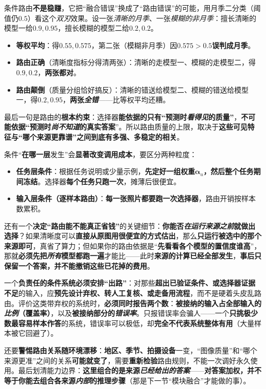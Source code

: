 条件路由\textbf{不是稳赚}，它把“融合错误”换成了“路由错误”的可能，用月季二分类（阈值仍$0.5$）看这个\emph{双刃}效果。设一张\emph{清晰的月季}、一张\emph{模糊的非月季}：擅长清晰的模型一给$0.9,0.95$，擅长模糊的模型二给$0.2,0.2$。
\begin{itemize}\item \textbf{等权平均}：得$0.55,0.575$，第二张（模糊非月季）因$0.575>0.5$\textbf{误判成月季}。\item \textbf{路由正确}（清晰度指标分得清两张）：清晰的走模型一、模糊的走模型二，得$0.9,0.2$，\textbf{两张都对}。\item \textbf{路由颠倒}（质量分组恰好搞反）：清晰的错送给模型二、模糊的错送给模型一，得$0.2,0.95$，\textbf{两张\emph{全错}}——比等权平均还糟。\end{itemize}
最后一句是路由的\textbf{根本约束}：选择器\textbf{能依据的只有“预测时\emph{看得见}的质量”}，\textbf{不可能依据“预测时\emph{尚不知道}的真实答案}”。所以路由质量的上限，取决于\textbf{这些可见特征与“哪个来源更靠谱”之间到底有多强、多稳定的相关}。

条件“\textbf{在哪一层}发生”会\textbf{显著改变调用成本}，要区分两种粒度：
\begin{itemize}\item \textbf{任务层条件}：根据任务说明或少量示例，\textbf{先定好一组权重$\bm{\alpha}_u$，然后整个任务期间冻结}。选择器\textbf{每个任务只跑一次}，摊薄后很便宜。\item \textbf{输入层条件（逐样本路由）}：\textbf{每一张照片都要跑一次选择器}，路由开销按样本数累积。\end{itemize}
还有一个\textbf{决定“路由能不能真正省钱”}的关键细节：\textbf{你能否\emph{在运行来源\emph{之前}}就做出选择}？如果清晰度可以\textbf{直接从原图用很便宜的方式估出}，那么\textbf{只运行被选中的那个来源即可}，真省了算力；但如果你的路由依据是“\textbf{先看看各个模型的置信度谁高}”，那就\textbf{必须先把\emph{所有}模型都跑一遍}才能比——此时\textbf{来源的计算已经全部发生}，\textbf{事后只保留一个答案，并不能撤销这些已花掉的费用}。

一个\textbf{负责任的条件系统必须安排“出路”}：对那些\textbf{超出已验证条件、或选择器证据不足}的输入，应\textbf{预先设计弃权、转人工复核、或走备用流程}，而不是硬着头皮乱路由。评价这类带弃权的系统时，\textbf{必须同时报告两个数}：\textbf{被接纳的输入占全部输入的\emph{比例}（覆盖率）}，以及\textbf{被接纳部分的\emph{错误率}}。只报错误率会骗人——一个\textbf{只挑极少数最容易样本作答}的系统，错误率可以极低，却\textbf{完全不代表系统整体有用}（大量样本被它回避了）。

还要\textbf{警惕路由关系随环境漂移}：\textbf{地区、季节、拍摄设备}一变，“图像质量”和“哪个来源更准”之间的关系\textbf{可能就变了}，需要\textbf{重新检验}路由规则，不能一次调好永久使用。最后划清能力边界：\textbf{这里组合的是来源\emph{已经给出的答案}}——\textbf{对答案加权，并不等于你能去组合各来源\emph{内部}的推理步骤}（那是下一节“模块融合”才能做的事）。

